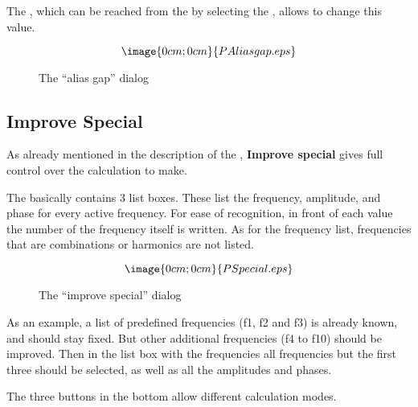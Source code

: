 The ,
which can be reached from the  by selecting the 
, allows to change this value.
\begin{figure}[h]
$$\image{0cm;0cm}{PAliasgap.eps}$$%
\caption{The ``alias gap'' dialog}%
\label{period.aliasgap.dialog}
\end{figure}

\subsection{Improve Special}%
\label{period.special}
As already mentioned in the description of the 
, {\bf Improve special} gives
full control over the calculation to make. 



The 
basically contains 3 list boxes. 
These list the frequency, amplitude, and phase for every active frequency.
For ease of recognition, in front of each value the number of the 
frequency itself is written.
As for the frequency list, frequencies that are combinations or 
harmonics are not listed.

\begin{figure}[h]
$$\image{0cm;0cm}{PSpecial.eps}$$%
\caption{The ``improve special'' dialog}%
\label{period.special.dialog}
\end{figure}

As an example, a list of predefined frequencies (f1, f2 and f3) is already 
known, and should stay fixed. But other additional frequencies (f4 to f10) 
should be improved. 
Then in the list box with the frequencies all frequencies
but the first three should be selected, as well as all the amplitudes
and phases.

The three buttons in the bottom allow different calculation modes.

